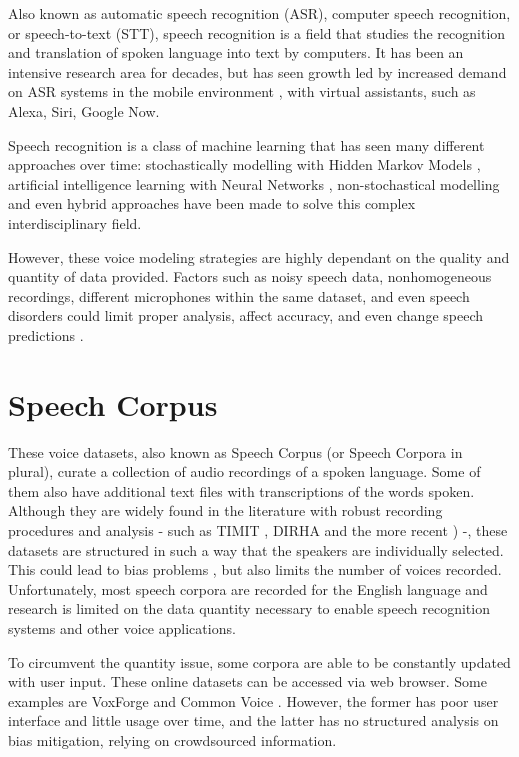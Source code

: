 Also known as automatic speech recognition (ASR), computer speech recognition, or speech-to-text (STT), speech recognition is a field that studies the recognition and translation of spoken language into text by computers. It has been an intensive research area for decades, but has seen growth led by increased demand on ASR systems in the mobile environment \cite{yu2016automatic}, with virtual assistants, such as Alexa, Siri, Google Now.

Speech recognition is a class of machine learning that has seen many different approaches over time: stochastically modelling with Hidden Markov Models  \cite{gales2008application}, artificial intelligence learning with Neural Networks \cite{graves2013speech}, non-stochastical modelling \cite{burget2003nonrandomattr} and even hybrid approaches \cite{wang2020transformer} have been made to solve this complex interdisciplinary field.

However, these voice modeling strategies are highly dependant on the quality and quantity of data provided. Factors such as noisy speech data, nonhomogeneous recordings, different microphones within the same dataset, and even speech disorders could limit proper analysis, affect accuracy, and even change speech predictions \cite{cooke2001robust}. 

\section*{Speech Corpus}

These voice datasets, also known as Speech Corpus (or Speech Corpora in plural), curate a collection of audio recordings of a spoken language. Some of them also have additional text files with transcriptions of the words spoken. Although they are widely found in the literature with robust recording procedures and analysis - such as TIMIT \cite{Lamel1992timmit}, DIRHA \cite{Ravanelli2016dirha} and the more recent \cite{chanchaochai2018globaltimit}) -, these datasets are structured in such a way that the speakers are individually selected. This could lead to bias problems \cite{bender2018data}, but also limits the number of voices recorded. Unfortunately, most speech corpora are recorded for the English language \cite{LeRouxVincent2014TRdatasets} and research is limited on the data quantity necessary to enable speech recognition systems and other voice applications.

To circumvent the quantity issue, some corpora are able to be constantly updated with user input. These online datasets can be accessed via web browser. Some examples are VoxForge and Common Voice \cite{ardila2019common}. However, the former has poor user interface and little usage over time, and the latter has no structured analysis on bias mitigation, relying on crowdsourced information.

